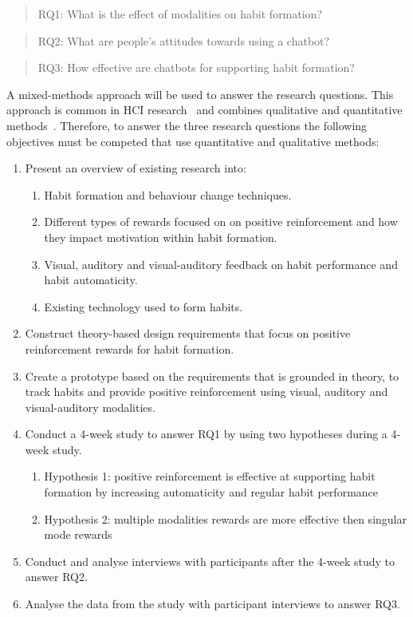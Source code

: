 \begin{quote}
RQ1: What is the effect of modalities on habit formation?
\end{quote}
\begin{quote}
RQ2: What are people's attitudes towards using a chatbot?
\end{quote}
\begin{quote}
RQ3: How effective are chatbots for supporting habit formation?
\end{quote}

A mixed-methods approach will be used to answer the research questions. This approach is common in HCI research~\cite{hci_mixed_methods} and combines qualitative and quantitative methods~\cite{hci_mixed_methods_2}. Therefore, to answer the three research questions the following objectives must be competed that use quantitative and qualitative methods:

\begin{enumerate}
    \item Present an overview of existing research into:
      \begin{enumerate}
        \item Habit formation and behaviour change techniques.
        \item Different types of rewards focused on on positive reinforcement and how they impact motivation within habit formation.
        \item Visual, auditory and visual-auditory feedback on habit performance and habit automaticity.
        \item Existing technology used to form habits.
      \end{enumerate}
    \item Construct theory-based design requirements that focus on positive reinforcement rewards for habit formation.
    \item Create a prototype based on the requirements that is grounded in theory, to track habits and provide positive reinforcement using visual, auditory and visual-auditory modalities.
    \item Conduct a 4-week study to answer RQ1 by using two hypotheses during a 4-week study.
    \begin{enumerate}
        \item Hypothesis 1: positive reinforcement is effective at supporting habit formation by increasing automaticity and regular habit performance
        \item Hypothesis 2: multiple modalities rewards are more effective then singular mode rewards
    \end{enumerate}
    \item Conduct and analyse interviews with participants after the 4-week study to answer RQ2.
    \item Analyse the data from the study with participant interviews to answer RQ3.
\end{enumerate}


